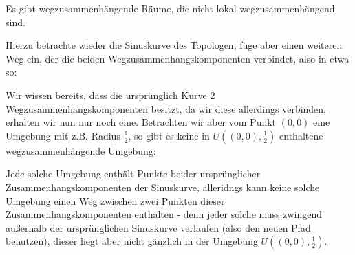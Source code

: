 \begin{example}
\begin{warning}
    Es gibt wegzusammenhängende Räume, die nicht lokal wegzusammenhängend sind.
\end{warning}
Hierzu betrachte wieder die Sinuskurve des Topologen, füge aber einen weiteren Weg ein, der die beiden Wegzusammenhangskomponenten verbindet, also in etwa so:

\begin{minipage}{\textwidth}
    \centering
\end{minipage}
Wir wissen bereits, dass die ursprünglich Kurve 2 Wegzusammenhangskomponenten besitzt, da wir diese allerdings verbinden, erhalten wir nun nur noch eine. Betrachten wir aber vom Punkt $(0,0)$ eine Umgebung mit z.B. Radius  $\frac{1}{2}$, so gibt es keine in $U\left((0,0),\frac{1}{2}\right)$ enthaltene wegzusammenhängende Umgebung:

Jede solche Umgebung enthält Punkte beider ursprünglicher Zusammenhangskomponenten der Sinuskurve, alleridngs kann keine solche Umgebung einen Weg zwischen zwei Punkten dieser Zusammenhangskomponenten enthalten - denn jeder solche muss zwingend außerhalb der ursprünglichen Sinuskurve verlaufen (also den neuen Pfad benutzen), dieser liegt aber nicht gänzlich in der Umgebung $U((0,0),\frac{1}{2})$.
\end{example}

